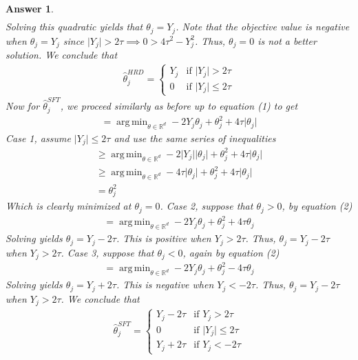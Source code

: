 \documentclass[12pt]{article}
\DeclareMathOperator*{\argmin}{arg\,min}
\theoremstyle{colon}
\newtheorem*{answer}{Answer}
\begin{document}
\begin{answer}
\begin{gather*}
  \end{gather*}
  Solving this quadratic yields that $\theta_j = Y_j$. Note that the objective value is negative when $\theta_j = Y_j$ since $\lvert Y_j \rvert > 2 \tau \implies 0 > 4 \tau^2 - Y_j^2$. Thus, $\theta_j = 0$ is not a better solution. We conclude that
  \begin{gather*}
    \hat{\theta}_j^{HRD} = \begin{cases}
      Y_j & \text{if } \lvert Y_j \rvert > 2 \tau \\
      0 & \text{if } \lvert Y_j \rvert \leq 2 \tau
    \end{cases}
  \end{gather*}
  Now for $\hat{\theta}_j^{SFT}$, we proceed similarly as before up to equation (1) to get
  \begin{gather}
    = \argmin_{\theta \in \mathbb{R}^d} - 2 Y_j \theta_j + \theta_j^2 + 4 \tau \lvert \theta_j \rvert
  \end{gather}
  Case 1, assume $\lvert Y_j \rvert \leq 2 \tau$ and use the same series of inequalities
  \begin{gather*}
    \geq \argmin_{\theta \in \mathbb{R}^d} - 2 \lvert Y_j \rvert \lvert \theta_j \rvert + \theta_j^2 + 4 \tau \lvert \theta_j \rvert \\
    \geq \argmin_{\theta \in \mathbb{R}^d} - 4 \tau \lvert \theta_j \rvert + \theta_j^2 + 4 \tau \lvert \theta_j \rvert \\
    = \theta_j^2
  \end{gather*}
  Which is clearly minimized at $\theta_j = 0$. Case 2, suppose that $\theta_j > 0$, by equation (2)
  \begin{gather*}
    = \argmin_{\theta \in \mathbb{R}^d} - 2 Y_j \theta_j + \theta_j^2 + 4 \tau \theta_j
  \end{gather*}
  Solving yields $\theta_j = Y_j - 2 \tau$. This is positive when $Y_j > 2 \tau$. Thus, $\theta_j = Y_j - 2 \tau$ when $Y_j > 2 \tau$. Case 3, suppose that $\theta_j < 0$, again by equation (2)
  \begin{gather*}
    = \argmin_{\theta \in \mathbb{R}^d} - 2 Y_j \theta_j + \theta_j^2 - 4 \tau \theta_j
  \end{gather*}
  Solving yields $\theta_j = Y_j + 2 \tau$. This is negative when $Y_j < -2 \tau$. Thus, $\theta_j = Y_j - 2 \tau$ when $Y_j > 2 \tau$. We conclude that
  \begin{gather*}
    \hat{\theta}_j^{SFT} = \begin{cases}
      Y_j - 2 \tau & \text{if } Y_j > 2 \tau \\
      0 & \text{if } \lvert Y_j \rvert \leq 2 \tau \\
      Y_j + 2 \tau & \text{if } Y_j < -2 \tau
    \end{cases}
  \end{gather*}
\end{answer}
\end{document}
